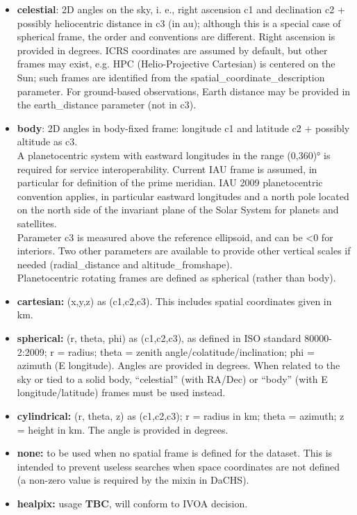 \documentclass[11pt,a4paper]{ivoa}
\begin{document}
\begin{itemize}
\item \textbf{celestial}: 2D angles on the sky, i. e., right ascension c1 and declination c2 + possibly heliocentric distance in c3 (in au); although this is a special case of spherical frame, the order and conventions are different. Right ascension is provided in degrees. ICRS coordinates are assumed by default, but other frames may exist, e.g. HPC (Helio-Projective Cartesian) is centered on the Sun; such frames are identified from the spatial\_coordinate\_description parameter. For ground-based observations, Earth distance may be provided in the earth\_distance parameter (not in c3). 
\item \textbf{body}: 2D angles in body-fixed frame: longitude c1 and latitude c2 + possibly altitude as c3. \\A planetocentric system with eastward longitudes in the range (0,360)° is required for service interoperability. Current IAU frame is assumed, in particular for definition of the prime meridian. IAU 2009 planetocentric convention applies, in particular eastward longitudes and a north pole located on the north side of the invariant plane of the Solar System for planets and satellites.  \\Parameter c3 is measured above the reference ellipsoid, and can be <0 for interiors. Two other parameters are available to provide other vertical scales if needed (radial\_distance and altitude\_fromshape). \\Planetocentric rotating frames are defined as spherical (rather than body).
\item \textbf{cartesian:} (x,y,z) as (c1,c2,c3). This includes spatial coordinates given in km. 
\item \textbf{spherical:} (r, theta, phi) as (c1,c2,c3), as defined in ISO standard 80000-2:2009; r = radius; theta = zenith angle/colatitude/inclination; phi = azimuth (E longitude). Angles are provided in degrees. When related to the sky or tied to a solid body, ``celestial'' (with RA/Dec) or ``body'' (with E longitude/latitude) frames must be used instead.
\item \textbf{cylindrical:} (r, theta, z) as (c1,c2,c3); r = radius in km; theta = azimuth; z = height in km. The angle is provided in degrees.
\item \textbf{none:} to be used when no spatial frame is defined for the dataset. This is intended to prevent useless searches when space coordinates are not defined (a non-zero value is required by the mixin in DaCHS).
\item \textbf{healpix:} usage \textbf{TBC}, will conform to IVOA decision.
\end{itemize}
\end{document}
